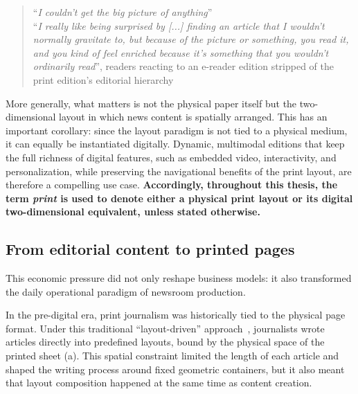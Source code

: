 \begin{enumerate}
    \begin{quote}
    ``{\itshape I couldn't get the big picture of anything}'' \\
    ``{\itshape I really like being surprised by [...] finding an article that I wouldn't normally gravitate to, but because of the picture or something, you read it, and you kind of feel enriched because it's something that you wouldn't ordinarily read}'',
    readers reacting to an e-reader edition stripped of the print edition's editorial hierarchy~\cite{hollander_e-reader_2011}
    \label{quote:global-awareness}
    \end{quote}

   
 
\end{enumerate}



\begin{callout}
More generally, what matters is not the physical paper itself but the two-dimensional layout in which news content is spatially arranged. This has an important corollary: since the layout paradigm is not tied to a physical medium, it can equally be instantiated digitally. Dynamic, multimodal editions that keep the full richness of digital features, such as embedded video, interactivity, and personalization, while preserving the navigational benefits of the print layout, are therefore a compelling use case. \textbf{Accordingly, throughout this thesis, the term \emph{print} is used to denote either a physical print layout or its digital two-dimensional equivalent, unless stated otherwise.}
\end{callout}

\subsection{From editorial content to printed pages}

This economic pressure did not only reshape business models: it also transformed the daily operational paradigm of newsroom production. 

In the pre-digital era, print journalism was historically tied to the physical page format. Under this traditional ``layout-driven'' approach~\cite{digitizing-news}, journalists wrote articles directly into predefined layouts, bound by the physical space of the printed sheet (a). This spatial constraint limited the length of each article and shaped the writing process around fixed geometric containers, but it also meant that layout composition happened at the same time as content creation.

